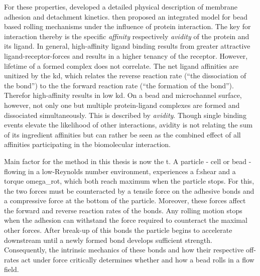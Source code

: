 \begin{figure}[!h]
\hfill
\label{fig:fluidic:model}
\end{figure}

\citet{lit:fluidic:rollingWall}


For these properties, \citet{lit:fluidic:BindingPhysics} developed a detailed physical description of membrane adhesion and detachment kinetics. \citet{lit:fluidic:ModelMIT} then proposed an integrated model for bead based rolling mechanisms under the influence of protein interaction. The key for interaction thereby is the specific \textit{affinity} respectively \textit{avidity} of the protein and its ligand. In general, high-affinity ligand binding results from greater attractive ligand-receptor-forces and results in a higher tenancy of the receptor. However, lifetime of a formed complex does not correlate. The net ligand affinities are unitized by the \gls{kd}, which relates the reverse reaction rate (``the dissociation of the bond'') to the the forward reaction rate (``the formation of the bond''). Therefor high-affinity results in low \gls{kd}.\newline
On a bead and microchannel surface, however, not only one but multiple protein-ligand complexes are formed and dissociated simultaneously. This is described by \textit{avidity}. Though single binding events elevate the likelihood of other interactions, avidity is not relating the sum of its ingredient affinities but can rather be seen as the combined effect of all affinities participating in the biomolecular interaction.\cite{lit:bio:aviditiy}

Main factor for the method in this thesis is now the \gls{t}. A particle - cell or bead - flowing in a low-Reynolds number environment, experiences a \gls{f:shear} and a torque \gls{omega_rot}, which both reach maximum when the particle stops. For this, the two forces must be counteracted by a tensile force on the adhesive bonds and a compressive force at the bottom of the particle. Moreover, these forces affect the forward and reverse reaction rates of the bonds. Any rolling motion stops when the adhesion can withstand the force required to counteract the maximal other forces. After break-up of this bonds the particle begins to accelerate downstream until a newly formed bond develops sufficient strength. Consequently, the intrinsic mechanics of these bonds and how their respective off-rates act under force critically determines whether and how a bead rolls in a flow field.\cite{lit:bio:CellAdhesion}


